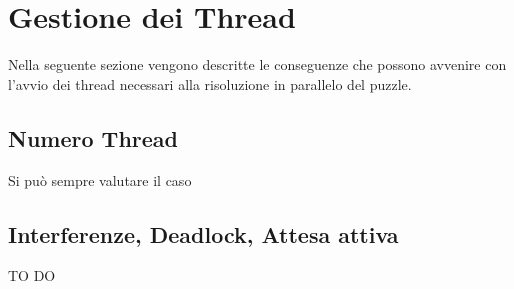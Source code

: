 % 
%
%

\section{Gestione dei Thread} %
\label{sec:gestione_dei_thread}
Nella seguente sezione vengono descritte le conseguenze che possono avvenire con l'avvio dei thread necessari alla risoluzione in parallelo del puzzle.

	\subsection{Numero Thread} %
	\label{sub:numero_thread}
	Si può sempre valutare il caso 
	
	\subsection{Interferenze, Deadlock, Attesa attiva} %
	\label{sub:interferenze_deadlock_attesa_attiva}
	TO DO
	



